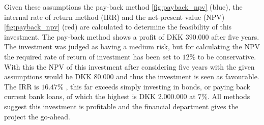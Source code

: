 Given these assumptions the pay-back method \ref{fig:payback_npv} (blue), the internal rate of return method (IRR) and the net-present value (NPV) \ref{fig:payback_npv} (red) are calculated to determine the feasibility of this investment.
The pay-back method shows a profit of DKK $390.000$ after five years. The investment was judged as having a medium risk, but for calculating the NPV the required rate of return of investment has been set to $12\%$ to be conservative. With this the NPV of this investment after considering five years with the given assumptions would be DKK $80.000$ and thus the investment is seen as favourable. The IRR is $16.47\%$ , this far exceeds simply investing in bonds, or paying back current bank loans, of which the highest is DKK $2.000.000$ at $7\%$.
All methods suggest this investment is profitable and the financial department gives the project the go-ahead.

